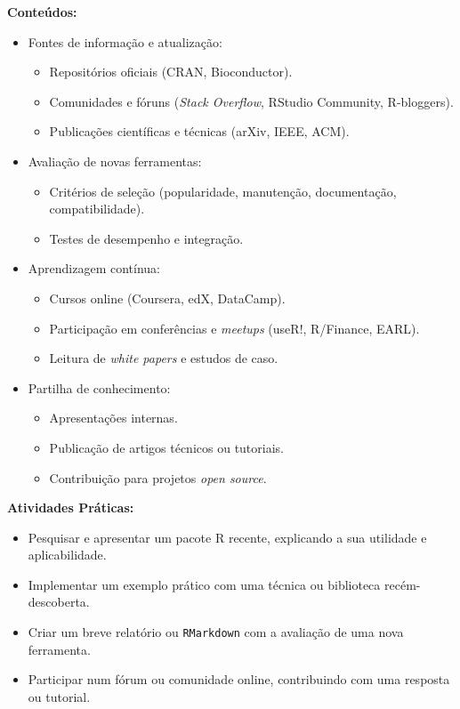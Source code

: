 \documentclass[12pt]{article}
\begin{document}
\textbf{Conteúdos:}
\begin{itemize}
  \item Fontes de informação e atualização:
    \begin{itemize}
      \item Repositórios oficiais (CRAN, Bioconductor).
      \item Comunidades e fóruns (\textit{Stack Overflow}, RStudio Community, R-bloggers).
      \item Publicações científicas e técnicas (arXiv, IEEE, ACM).
    \end{itemize}
  \item Avaliação de novas ferramentas:
    \begin{itemize}
      \item Critérios de seleção (popularidade, manutenção, documentação, compatibilidade).
      \item Testes de desempenho e integração.
    \end{itemize}
  \item Aprendizagem contínua:
    \begin{itemize}
      \item Cursos online (Coursera, edX, DataCamp).
      \item Participação em conferências e \textit{meetups} (useR!, R/Finance, EARL).
      \item Leitura de \textit{white papers} e estudos de caso.
    \end{itemize}
  \item Partilha de conhecimento:
    \begin{itemize}
      \item Apresentações internas.
      \item Publicação de artigos técnicos ou tutoriais.
      \item Contribuição para projetos \textit{open source}.
    \end{itemize}
\end{itemize}

\textbf{Atividades Práticas:}
\begin{itemize}
  \item Pesquisar e apresentar um pacote R recente, explicando a sua utilidade e aplicabilidade.
  \item Implementar um exemplo prático com uma técnica ou biblioteca recém-descoberta.
  \item Criar um breve relatório ou \texttt{RMarkdown} com a avaliação de uma nova ferramenta.
  \item Participar num fórum ou comunidade online, contribuindo com uma resposta ou tutorial.
\end{itemize}
\end{document}
